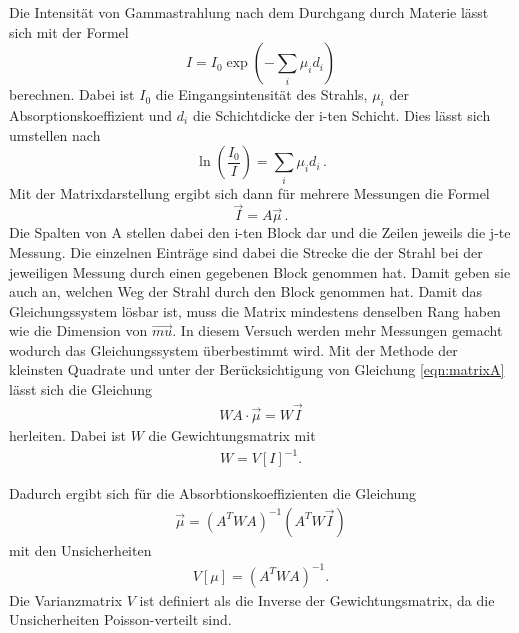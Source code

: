 Die Intensität von Gammastrahlung nach dem Durchgang durch Materie lässt sich mit der Formel
\begin{equation}
    I = I_0 \exp(-\sum_i \mu_i d_i)
\end{equation}
berechnen.
Dabei ist $I_0$ die Eingangsintensität des Strahls, $\mu_i$ der Absorptionskoeffizient und $d_i$ die Schichtdicke der i-ten Schicht.
Dies lässt sich umstellen nach
\begin{equation}
    \ln(\frac{I_0}{I}) = \sum_i \mu_i d_i \,.
\end{equation}
Mit der Matrixdarstellung ergibt sich dann für mehrere Messungen die Formel
\begin{equation}
    \label{eqn:matrixA}
    \vec{I} = A \vec{\mu} \,.
\end{equation}
Die Spalten von A stellen dabei den i-ten Block dar und die Zeilen jeweils die j-te Messung. Die einzelnen Einträge sind dabei die Strecke die der Strahl bei der jeweiligen Messung durch einen gegebenen Block genommen hat. Damit geben sie auch an, welchen Weg der Strahl durch den Block genommen hat.
Damit das Gleichungssystem lösbar ist, muss die Matrix mindestens denselben Rang haben wie die Dimension von $\vec{mu}$. 
In diesem Versuch werden mehr Messungen gemacht wodurch das Gleichungssystem überbestimmt wird. Mit der Methode der kleinsten Quadrate und unter der Berücksichtigung von Gleichung \ref{eqn:matrixA} lässt sich die Gleichung 
\begin{align}
    W A \cdot \vec{\mu} = W \vec{I}
\end{align}
herleiten. Dabei ist $W$ die Gewichtungsmatrix mit 
\begin{align}
    W = V[I] ^{-1}.
\end{align}

Dadurch ergibt sich für die Absorbtionskoeffizienten die Gleichung 
\begin{align}
    \label{eqn:mu}
    \vec{\mu} = (A^T W A)^{-1} (A^T W \vec{I})
\end{align}
mit den Unsicherheiten
\begin{align}
    V[\mu] = (A^T W A)^{-1}.
\end{align}
Die Varianzmatrix $V$ ist definiert als die Inverse der Gewichtungsmatrix, da die Unsicherheiten Poisson-verteilt sind. 